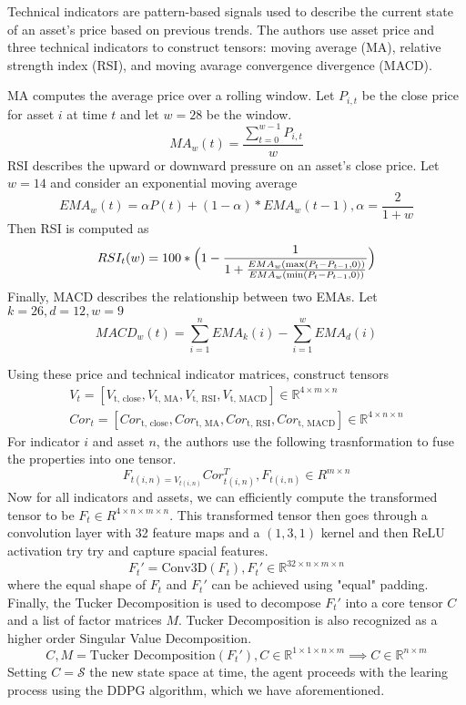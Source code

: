 Technical indicators are pattern-based signals used to describe the current state 
of an asset's price based on previous trends. The authors use asset price and three technical indicators to construct 
tensors: moving average (MA), relative strength index (RSI), and moving avarage convergence divergence (MACD).

MA computes the average price over a rolling window. Let $P_{i,t}$ be the close 
price for asset $i$ at time $t$ and let $w = 28$ be the window. 
\[MA_w(t) = \frac{\sum_{t=0}^{w-1}P_{i, t}}{w}\] 
RSI describes the upward or downward pressure on an asset's close price.
Let $w=14$ and consider an exponential moving average 
\[EMA_w(t) = \alpha P(t) + (1-\alpha) * EMA_w(t-1), \alpha = \frac{2}{1 + w}\]
Then RSI is computed as 
\[RSI_t(w) = 100 * \Bigl(1 - \frac{1}{1 + \frac{EMA_w(\max(P_t - P_{t-1}, 0))}{EMA_w(\min(P_t - P_{t-1}, 0))}}\Bigr)\]
Finally, MACD describes the relationship between two EMAs. Let $k = 26, d=12, w=9$
\[MACD_w(t) = \sum_{i=1}^n EMA_k(i) - \sum_{i=1}^w EMA_d(i)\]

Using these price and technical indicator matrices, construct tensors 
\begin{align*}
  V_t = [V_{\text{t, close}}, V_{\text{t, MA}}, V_{\text{t, RSI}}, V_{\text{t, MACD}}] \in \mathbb{R}^{4 \times m \times n}\\
  Cor_t = [Cor_{\text{t, close}}, Cor_{\text{t, MA}}, Cor_{\text{t, RSI}}, Cor_{\text{t, MACD}}] \in \mathbb{R}^{4 \times n \times n}
\end{align*}
For indicator $i$ and asset $n$, the authors use the following trasnformation to fuse the properties 
into one tensor. 
\[F_{t(i, n) = V_{t(i, n)}} Cor^T_{t(i, n)}, F_{t(i, n)} \in R^{m \times n}\]
Now for all indicators and assets, we can efficiently compute the transformed tensor to be $F_t \in R^{4 \times n \times m \times n}$.
This transformed tensor then goes through a convolution layer with 32 feature maps and a $(1, 3, 1)$ kernel and then ReLU activation try 
try and capture spacial features.
\[F_t' = \text{Conv3D}(F_t), F_t' \in \mathbb{R}^{32 \times n \times m \times n}\]
where the equal shape of $F_t$ and $F_t'$ can be achieved using "equal" padding. Finally, the Tucker Decomposition is used
to decompose $F_t'$ into a core tensor $C$ and a list of factor matrices $M$. Tucker Decomposition is also recognized as a higher order Singular Value Decomposition. 
\[C, M = \text{Tucker Decomposition}(F_t'), C \in \mathbb{R}^{1 \times 1 \times n \times m} \implies C \in \mathbb{R}^{n \times m}\]
Setting $C = \mathcal{S}$ the new state space at time, the agent proceeds with the learing process
using the DDPG algorithm, which we have aforementioned.

